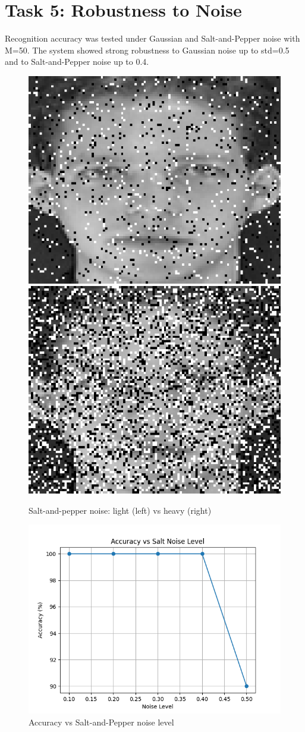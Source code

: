 \documentclass[conference]{IEEEtran}
\begin{document}
\section{Task 5: Robustness to Noise}
Recognition accuracy was tested under Gaussian and Salt-and-Pepper noise with M=50. The system showed strong robustness to Gaussian noise up to std=0.5 and to Salt-and-Pepper noise up to 0.4.

\begin{figure}[htbp]
\centering
\includegraphics[width=0.48\linewidth]{noise/saltpepper/noisy_salt_01_1.png}
\includegraphics[width=0.48\linewidth]{noise/saltpepper/noisy_salt_05_1.png}
\caption{Salt-and-pepper noise: light (left) vs heavy (right)}
\end{figure}

\begin{figure}[htbp]
\centering
\includegraphics[width=\linewidth]{noise/saltpepper/accuracy_vs_salt_noise.png}
\caption{Accuracy vs Salt-and-Pepper noise level}
\end{figure}
\end{document}
